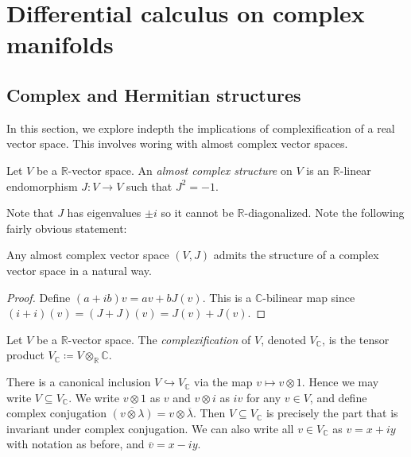 \chapter{Differential calculus on complex manifolds}

\section{Complex and Hermitian structures}


In this section, we explore indepth the implications of complexification of a real vector space. This involves woring with almost complex vector spaces.

\begin{definition}\label{dfn:3.1.1}
	Let $V$ be a $\mathbb{R} $-vector space. An \emph{almost complex structure} on $V$ is an $\mathbb{R} $-linear endomorphism $J : V \to V$ such that $J^2=-1$.
\end{definition}

Note that $J$ has eigenvalues $\pm i$ so it cannot be $\mathbb{R} $-diagonalized. Note the following fairly obvious statement:

\begin{lemma}\label{lma:3.1.2}
	Any almost complex vector space $(V,J)$ admits the structure of a complex vector space in a natural way.
\end{lemma}
\begin{proof}
	Define $(a+ib)v = av + bJ(v)$. This is a $\mathbb{C} $-bilinear map since $(i+i)(v)=(J+J)(v)=J(v)+J(v)$.
\end{proof}

\begin{definition}\label{dfn:3.1.3}
Let $V$ be a $\mathbb{R} $-vector space. The \emph{complexification} of $V$, denoted $V_\mathbb{C} $, is the tensor product $V_\mathbb{C} \coloneqq V\otimes _\mathbb{R} \mathbb{C} $.
\end{definition}
\begin{remark}\label{rmk:3.1.4}
	There is a canonical inclusion $V\hookrightarrow V_\mathbb{C} $ via the map $v\mapsto v\otimes 1$. Hence we may write $V\subseteq V_\mathbb{C} $. We write $v\otimes 1$ as $v$ and $v\otimes i$ as $iv$ for any $v\in V$, and define complex conjugation $\overline{(v\otimes \lambda )} =v\otimes \overline{\lambda } $. Then $V\subseteq V_\mathbb{C} $ is precisely the part that is invariant under complex conjugation. We can also write all $v\in V_\mathbb{C} $ as $v=x+iy$ with notation as before, and $\overline{v} =x-iy$.
\end{remark}

